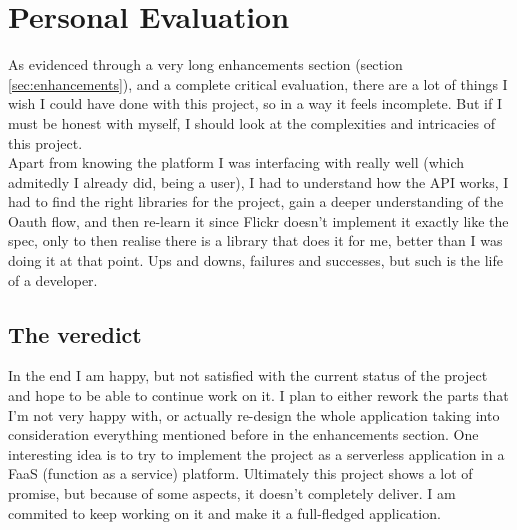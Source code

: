 \documentclass[10pt, a4paper]{article}
\begin{document}
        \section{Personal Evaluation}
        As evidenced through a very long enhancements section (section \ref{sec:enhancements}), and a complete critical evaluation, there are a lot of things I wish I could have done with this project, so in a way it feels incomplete.
        But if I must be honest with myself, I should look at the complexities and intricacies of this project.\\
        Apart from knowing the platform I was interfacing with really well (which admitedly I already did, being a user), I had to understand how the API works, I had to find the right libraries for the project, gain a deeper understanding of the Oauth flow, and then re-learn it since Flickr doesn't implement it exactly like the spec, only to then realise there is a library that does it for me, better than I was doing it at that point. Ups and downs, failures and successes, but such is the life of a developer.

        \subsection{The veredict}
        In the end I am happy, but not satisfied with the current status of the project and hope to be able to continue work on it. I plan to either rework the parts that I'm not very happy with, or actually re-design the whole application taking into consideration everything mentioned before in the enhancements section. One interesting idea is to try to implement the project as a serverless application in a FaaS (function as a service) platform.
        Ultimately this project shows a lot of promise, but because of some aspects, it doesn't completely deliver. I am commited to keep working on it and make it a full-fledged application.

        
        

        
\end{document}
